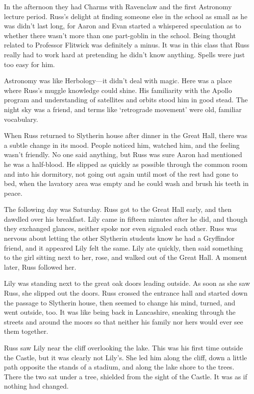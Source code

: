 In the afternoon they had Charms with Ravenclaw and the first Astronomy lecture period. Russ's delight at finding someone else in the school as small as he was didn't last long, for Aaron and Evan started a whispered speculation as to whether there wasn't more than one part-goblin in the school. Being thought related to Professor Flitwick was definitely a minus. It was in this class that Russ really had to work hard at pretending he didn't know anything. Spells were just too easy for him.

Astronomy was like Herbology—it didn't deal with magic. Here was a place where Russ's muggle knowledge could shine. His familiarity with the Apollo program and understanding of satellites and orbits stood him in good stead. The night sky was a friend, and terms like `retrograde movement' were old, familiar vocabulary.

When Russ returned to Slytherin house after dinner in the Great Hall, there was a subtle change in its mood. People noticed him, watched him, and the feeling wasn't friendly. No one said anything, but Russ was sure Aaron had mentioned he was a half-blood. He slipped as quickly as possible through the common room and into his dormitory, not going out again until most of the rest had gone to bed, when the lavatory area was empty and he could wash and brush his teeth in peace.

The following day was Saturday. Russ got to the Great Hall early, and then dawdled over his breakfast. Lily came in fifteen minutes after he did, and though they exchanged glances, neither spoke nor even signaled each other. Russ was nervous about letting the other Slytherin students know he had a Gryffindor friend, and it appeared Lily felt the same. Lily ate quickly, then said something to the girl sitting next to her, rose, and walked out of the Great Hall. A moment later, Russ followed her.

Lily was standing next to the great oak doors leading outside. As soon as she saw Russ, she slipped out the doors. Russ crossed the entrance hall and started down the passage to Slytherin house, then seemed to change his mind, turned, and went outside, too. It was like being back in Lancashire, sneaking through the streets and around the moors so that neither his family nor hers would ever see them together.

Russ saw Lily near the cliff overlooking the lake. This was his first time outside the Castle, but it was clearly not Lily's. She led him along the cliff, down a little path opposite the stands of a stadium, and along the lake shore to the trees. There the two sat under a tree, shielded from the sight of the Castle. It was as if nothing had changed.

